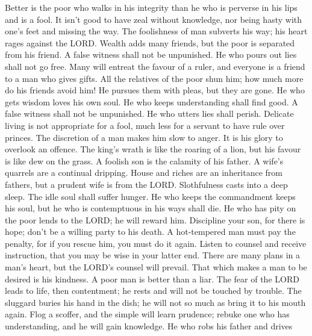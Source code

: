  Better is the poor who walks in his integrity than he who
is perverse in his lips and is a fool.  It isn't good to
have zeal without knowledge, nor being hasty with one's feet and missing
the way.  The foolishness of man subverts his way; his
heart rages against the LORD.  Wealth adds many friends,
but the poor is separated from his friend.  A false
witness shall not be unpunished. He who pours out lies shall not go
free.  Many will entreat the favour of a ruler, and
everyone is a friend to a man who gives gifts.  All the
relatives of the poor shun him; how much more do his friends avoid him!
He pursues them with pleas, but they are gone.  He who
gets wisdom loves his own soul. He who keeps understanding shall find
good.  A false witness shall not be unpunished. He who
utters lies shall perish.  Delicate living is not
appropriate for a fool, much less for a servant to have rule over
princes.  The discretion of a man makes him slow to
anger. It is his glory to overlook an offence.  The
king's wrath is like the roaring of a lion, but his favour is like dew
on the grass.  A foolish son is the calamity of his
father. A wife's quarrels are a continual dripping. 
House and riches are an inheritance from fathers, but a prudent wife is
from the LORD.  Slothfulness casts into a deep sleep. The
idle soul shall suffer hunger.  He who keeps the
commandment keeps his soul, but he who is contemptuous in his ways shall
die.  He who has pity on the poor lends to the LORD; he
will reward him.  Discipline your son, for there is hope;
don't be a willing party to his death.  A hot-tempered
man must pay the penalty, for if you rescue him, you must do it again.
 Listen to counsel and receive instruction, that you may
be wise in your latter end.  There are many plans in a
man's heart, but the LORD's counsel will prevail.  That
which makes a man to be desired is his kindness. A poor man is better
than a liar.  The fear of the LORD leads to life, then
contentment; he rests and will not be touched by trouble.
 The sluggard buries his hand in the dish; he will not so
much as bring it to his mouth again.  Flog a scoffer, and
the simple will learn prudence; rebuke one who has understanding, and he
will gain knowledge.  He who robs his father and drives
